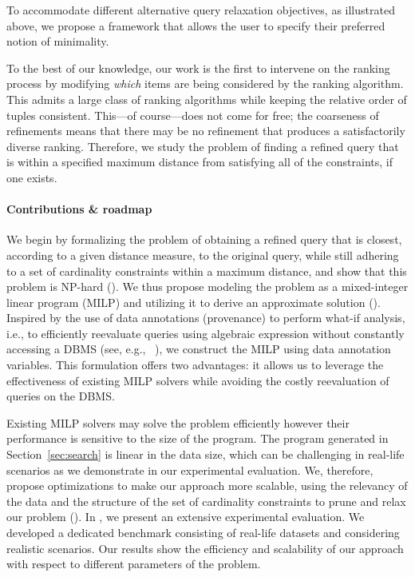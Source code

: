 To accommodate different alternative query relaxation objectives, as illustrated above, we propose a framework that allows the user to specify their preferred notion of minimality. 

To the best of our knowledge, our work is the first to intervene on the ranking process by modifying {\it which} items are being considered by the ranking algorithm. This admits a large class of ranking algorithms while keeping the relative order of tuples consistent. This---of course---does not come for free; the coarseness of refinements means that there may be no refinement that produces a satisfactorily diverse ranking. Therefore, we study the problem of finding a refined query %
that is within a specified maximum distance from satisfying all of the constraints, if one exists. %








\paragraph*{\textbf{Contributions \& roadmap}}
We begin by formalizing the \problem{} problem of obtaining a refined query that is closest, according to a given distance measure, to the original query, while still adhering to a set of cardinality constraints within a maximum distance, and show that this problem is {\sf NP-hard} ().
We thus propose modeling the problem as a mixed-integer linear program (MILP) and utilizing it to derive an approximate solution (). Inspired by the use of data annotations (provenance) to perform what-if analysis, i.e., to efficiently reevaluate queries using algebraic expression without constantly accessing a DBMS (see, e.g., ~\cite{DIMT13, BourhisDM16, DeutchMT14, MoskovitchLJ22}), we construct the MILP using data annotation variables. 
This formulation offers two advantages: it allows us to leverage the effectiveness of existing MILP solvers while avoiding the costly reevaluation of queries on the DBMS.

Existing MILP solvers may solve the problem efficiently however their performance is sensitive to the size of the program. The program generated in Section~\ref{sec:search} is linear in the data size, which can be challenging in real-life scenarios as we demonstrate in our experimental evaluation. We, therefore, propose optimizations to make our approach more scalable, using the relevancy of the data and the structure of the set of cardinality constraints to prune and relax our problem (). In , we present an extensive experimental evaluation. We developed a dedicated benchmark consisting of real-life datasets and considering realistic scenarios. Our results show the efficiency and scalability of our approach with respect to different parameters of the problem. 





